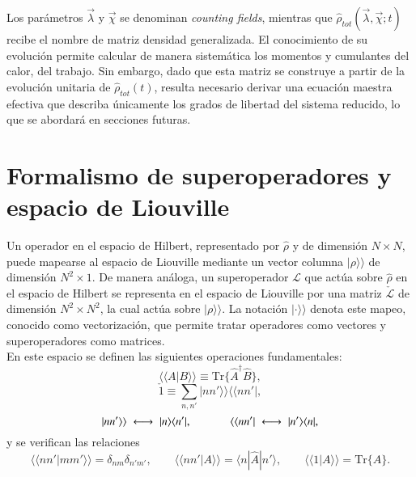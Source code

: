 Los parámetros $\vec{\lambda}$ y $\vec{\chi}$ se denominan \textit{counting fields}\cite{esposito2009nonequilibrium,landi2024current}, mientras que $\hat{\rho}_{tot}(\vec{\lambda},\vec{\chi};t)$ recibe el nombre de matriz densidad generalizada. El conocimiento de su evolución permite calcular de manera sistemática los momentos y cumulantes del calor, del trabajo. Sin embargo, dado que esta matriz se construye a partir de la evolución unitaria de $\hat{\rho}_{tot}(t)$, resulta necesario derivar una ecuación maestra efectiva que describa únicamente los grados de libertad del sistema reducido, lo que se abordará en secciones futuras.


\label{sec2:estadistica2puntos}

\section{Formalismo de superoperadores y espacio de Liouville} 

Un operador en el espacio de Hilbert, representado por $\hat{\rho}$ y de dimensión $N\times N$, puede mapearse al espacio de Liouville mediante un vector columna $|\rho \rangle \rangle$ de dimensión $N^{2}\times 1$. De manera análoga, un superoperador $\mathcal{L}$ que actúa sobre $\hat{\rho}$ en el espacio de Hilbert se representa en el espacio de Liouville por una matriz $\check{\mathcal{L}}$ de dimensión $N^2 \times N^2$, la cual actúa sobre $|\rho\rangle\rangle$. La notación $|\cdot\rangle\rangle$ denota este mapeo, conocido como vectorización, que permite tratar operadores como vectores y superoperadores como matrices.
\\

En este espacio se definen las siguientes operaciones fundamentales:
\begin{equation*}
    \langle \langle A|B\rangle \rangle  \equiv \text{Tr}\{\hat{A}^{\dagger}\hat{B}\},
\end{equation*}
\begin{equation*}
    \check{1}  \equiv \sum_{n,n'}|nn'\rangle \rangle \langle \langle nn'|,
\end{equation*}
\begin{equation*}
     |nn'\rangle \rangle \;\longleftrightarrow\; |n\rangle \langle n'|,
     \hspace{12mm}  
     \langle \langle nn'| \;\longleftrightarrow\; |n'\rangle \langle n|,
\end{equation*}
y se verifican las relaciones
\begin{equation*}
     \langle \langle nn'|mm'\rangle \rangle  = \delta_{nm}\delta_{n'm'},
     \qquad
     \langle \langle nn'|A\rangle \rangle  = \langle n|\hat{A}|n'\rangle,
     \qquad
     \langle \langle 1|A\rangle \rangle  = \text{Tr}\{\hat{A}\}.
\end{equation*}

